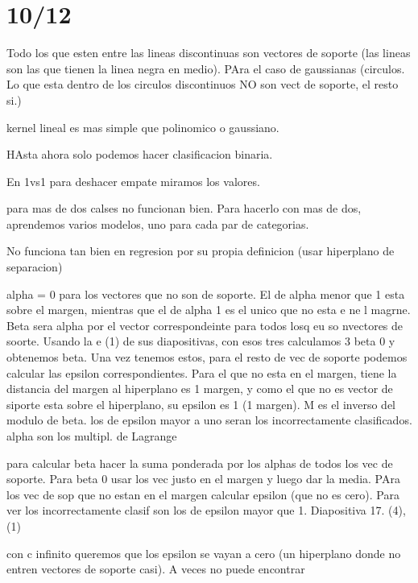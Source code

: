 \section{10/12}


Todo los que esten entre las lineas discontinuas son vectores de soporte (las lineas son las que tienen la linea negra en medio). PAra el caso de gaussianas (circulos. Lo que esta dentro de los circulos discontinuos NO son vect de soporte, el resto si.)

kernel lineal es mas simple que polinomico o gaussiano. 

HAsta ahora solo podemos hacer clasificacion binaria. 

En 1vs1 para deshacer empate miramos los valores.

para mas de dos calses no funcionan bien. Para hacerlo con mas de dos, aprendemos varios modelos, uno para cada par de categorias. 


No funciona tan bien en regresion por su propia definicion (usar hiperplano de separacion)


\begin{example}
alpha = 0 para los vectores que no son de soporte. El de alpha menor que 1 esta sobre el margen, mientras que el de alpha 1 es el unico que no esta e ne l magrne. Beta sera alpha por el vector correspondeinte para todos losq eu so nvectores de soorte. Usando la e (1) de sus diapositivas, con esos tres calculamos 3 beta 0 y obtenemos beta. Una vez tenemos estos, para el resto de vec de soporte podemos calcular las epsilon correspondientes. Para el que no esta en el margen, tiene la distancia del margen al hiperplano es 1 margen, y como el que no es vector de siporte esta sobre el hiperplano, su epsilon es 1 (1 margen). M es el inverso del modulo de beta. los de epsilon mayor a uno seran los incorrectamente clasificados.   \\


alpha son los multipl. de Lagrange

para calcular beta hacer la suma ponderada por los alphas de todos los vec de soporte. Para beta 0 usar los vec justo en el margen y luego dar la media. PAra los vec de sop que no estan en el margen calcular epsilon (que no es cero). Para ver los incorrectamente clasif son los de epsilon mayor que 1. Diapositiva 17. (4), (1)
\end{example}

con c infinito queremos que los epsilon se vayan a cero (un hiperplano donde no entren vectores de soporte casi). A veces no puede encontrar 